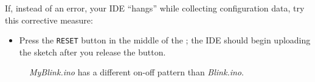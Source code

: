         If, instead of an error, your IDE ``hangs'' while collecting configuration data, try this corrective measure:

        \begin{itemize}
            \item Press the \texttt{RESET} button in the middle of the \developmentboard; the IDE should begin uploading the sketch after you release the button.
        \end{itemize}

    \begin{figure}
        \centering
        \caption{\textit{MyBlink.ino} has a different on-off pattern than \textit{Blink.ino}.\label{fig:myblink}}
    \end{figure}

